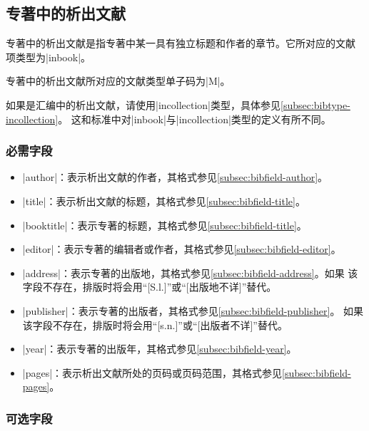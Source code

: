 \subsection{专著中的析出文献}\label{subsec:bibtype-inbook}

专著中的析出文献是指专著中某一具有独立标题和作者的章节。它所对应的{\BibTeX}文献
项类型为|inbook|。

专著中的析出文献所对应的文献类型\cite{gbt3469-1983}单子码为|M|。

\begin{note}
如果是汇编中的析出文献，请使用|incollection|类型，具体参见\ref{subsec:bibtype-incollection}。
这和标准{\BibTeX}中对|inbook|与|incollection|类型的定义有所不同。
\end{note}

\subsubsection{必需字段}

\begin{itemize}
\item |author|：表示析出文献的作者，其格式参见\ref{subsec:bibfield-author}。
\item |title|：表示析出文献的标题，其格式参见\ref{subsec:bibfield-title}。
\item |booktitle|：表示专著的标题，其格式参见\ref{subsec:bibfield-title}。
\item |editor|：表示专著的编辑者或作者，其格式参见\ref{subsec:bibfield-editor}。
\item |address|：表示专著的出版地，其格式参见\ref{subsec:bibfield-address}。如果
  该字段不存在，{\BibTeX}排版时将会用``[S.l.]''或``[出版地不详]''替代。
\item |publisher|：表示专著的出版者，其格式参见\ref{subsec:bibfield-publisher}。
  如果该字段不存在，{\BibTeX}排版时将会用``[s.n.]''或``[出版者不详]''替代。
\item |year|：表示专著的出版年，其格式参见\ref{subsec:bibfield-year}。
\item |pages|：表示析出文献所处的页码或页码范围，其格式参见\ref{subsec:bibfield-pages}。
\end{itemize}

\subsubsection{可选字段}

